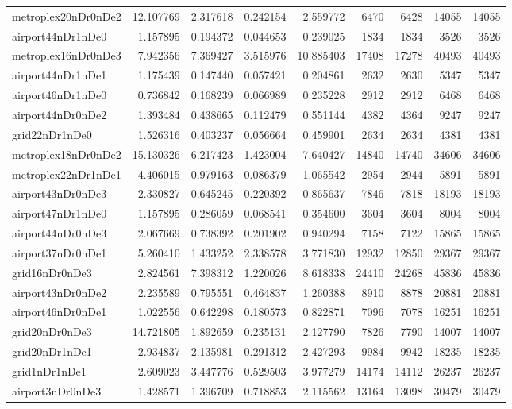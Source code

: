 \begin{longtable}{|l|r|r|r|r|r|r|r|r|}
metroplex20nDr0nDe2 & 12.107769 & 2.317618 & 0.242154 & 2.559772 & 6470 & 6428 & 14055 & 14055 \\
airport44nDr1nDe0 & 1.157895 & 0.194372 & 0.044653 & 0.239025 & 1834 & 1834 & 3526 & 3526 \\
metroplex16nDr0nDe3 & 7.942356 & 7.369427 & 3.515976 & 10.885403 & 17408 & 17278 & 40493 & 40493 \\
airport44nDr1nDe1 & 1.175439 & 0.147440 & 0.057421 & 0.204861 & 2632 & 2630 & 5347 & 5347 \\
airport46nDr1nDe0 & 0.736842 & 0.168239 & 0.066989 & 0.235228 & 2912 & 2912 & 6468 & 6468 \\
airport44nDr0nDe2 & 1.393484 & 0.438665 & 0.112479 & 0.551144 & 4382 & 4364 & 9247 & 9247 \\
grid22nDr1nDe0 & 1.526316 & 0.403237 & 0.056664 & 0.459901 & 2634 & 2634 & 4381 & 4381 \\
metroplex18nDr0nDe2 & 15.130326 & 6.217423 & 1.423004 & 7.640427 & 14840 & 14740 & 34606 & 34606 \\
metroplex22nDr1nDe1 & 4.406015 & 0.979163 & 0.086379 & 1.065542 & 2954 & 2944 & 5891 & 5891 \\
airport43nDr0nDe3 & 2.330827 & 0.645245 & 0.220392 & 0.865637 & 7846 & 7818 & 18193 & 18193 \\
airport47nDr1nDe0 & 1.157895 & 0.286059 & 0.068541 & 0.354600 & 3604 & 3604 & 8004 & 8004 \\
airport44nDr0nDe3 & 2.067669 & 0.738392 & 0.201902 & 0.940294 & 7158 & 7122 & 15865 & 15865 \\
airport37nDr0nDe1 & 5.260410 & 1.433252 & 2.338578 & 3.771830 & 12932 & 12850 & 29367 & 29367 \\
grid16nDr0nDe3 & 2.824561 & 7.398312 & 1.220026 & 8.618338 & 24410 & 24268 & 45836 & 45836 \\
airport43nDr0nDe2 & 2.235589 & 0.795551 & 0.464837 & 1.260388 & 8910 & 8878 & 20881 & 20881 \\
airport46nDr0nDe1 & 1.022556 & 0.642298 & 0.180573 & 0.822871 & 7096 & 7078 & 16251 & 16251 \\
grid20nDr0nDe3 & 14.721805 & 1.892659 & 0.235131 & 2.127790 & 7826 & 7790 & 14007 & 14007 \\
grid20nDr1nDe1 & 2.934837 & 2.135981 & 0.291312 & 2.427293 & 9984 & 9942 & 18235 & 18235 \\
grid1nDr1nDe1 & 2.609023 & 3.447776 & 0.529503 & 3.977279 & 14174 & 14112 & 26237 & 26237 \\
airport3nDr0nDe3 & 1.428571 & 1.396709 & 0.718853 & 2.115562 & 13164 & 13098 & 30479 & 30479 \\

\end{longtable}
